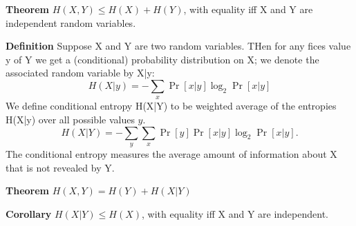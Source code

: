 \documentclass[a4paper,10pt]{article}
\begin{document}
\noindent
\textbf{Theorem} $H(X,Y) \leq H(X) + H(Y)$, with equality iff X and Y are independent random variables.

\noindent
\textbf{Definition} Suppose X and Y are two random variables. THen for any fices value y of Y we get a (conditional) probability distribution on X; we denote the associated random variable by X|y:
$$
H(X|y) = -\sum_x \Pr[x|y]\log_2 \Pr[x|y]
$$
We define conditional entropy H(X|Y) to be weighted average of the entropies H(X|y) over all possible values $y$.
$$
H(X|Y) = -\sum_y\sum_x\Pr[y]\Pr[x|y]\log_2\Pr[x|y].
$$
The conditional entropy measures the average amount of information about X that is not revealed by Y.

\noindent
\textbf{Theorem} $H(X,Y) = H(Y) + H(X|Y)$

\noindent
\textbf{Corollary} $H(X|Y) \leq H(X)$, with equality iff X and Y are independent.
\end{document}

